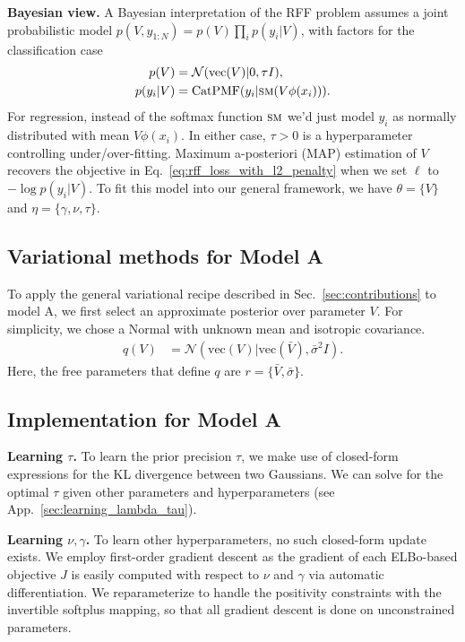 \textbf{Bayesian view.}
A Bayesian interpretation of the RFF problem assumes a joint probabilistic model $p(V, y_{1:N}) = p(V) \prod_{i} p(y_i | V)$, with factors for the classification case
\begin{align}
    \label{eq:rff_joint_pdf_model}
    p(V) &= \mathcal{N}( \text{vec}(V) | 0, \tau I), \\
    p(y_i | V) &= \text{CatPMF}( y_i | \textsc{sm}( V\phi(x_i) ) ).
\end{align}
For regression, instead of the softmax function $\textsc{sm}$ we'd just model $y_i$ as normally distributed with mean $V \phi(x_i)$. 
In either case, $\tau > 0$ is a hyperparameter controlling under/over-fitting.
Maximum a-posteriori (MAP) estimation of $V$ recovers the objective in Eq.~\eqref{eq:rff_loss_with_l2_penalty} when we set $\ell$ to $- \log p(y_i | V)$. To fit this model into our general framework, we have $\theta = \{V\}$ and $\eta = \{\gamma, \nu, \tau\}$.

\subsection{Variational methods for Model A}
\label{sec:caseA_variational}

To apply the general variational recipe described in Sec.~\ref{sec:contributions} to model A, we first select an approximate posterior over parameter $V$. For simplicity, we chose a Normal with unknown mean and isotropic covariance.
\begin{align}
    q(V) &= \mathcal{N}( \text{vec}(V) | \text{vec}(\bar{V}), \bar{\sigma}^2 I).
\end{align}
Here, the free parameters that define $q$ are $r = \{\bar{V}, \bar{\sigma} \}$.

\subsection{Implementation for Model A}

\textbf{Learning $\tau$.}
To learn the prior precision $\tau$, we make use of closed-form expressions for the KL divergence between two Gaussians. We can solve for the optimal $\tau$ given other parameters and hyperparameters (see App.~\ref{sec:learning_lambda_tau}).

\textbf{Learning $\nu,\gamma$.}
To learn other hyperparameters, no such closed-form update exists. We employ first-order gradient descent as the gradient of each ELBo-based objective $J$ is easily computed with respect to $\nu$ and $\gamma$ via automatic differentiation. We reparameterize to handle the positivity constraints with the invertible softplus mapping, so that all gradient descent is done on unconstrained parameters.

